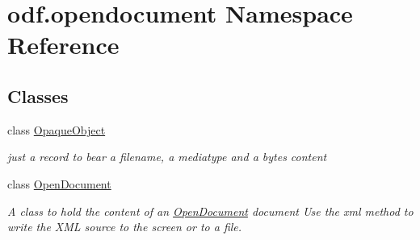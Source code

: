 \hypertarget{namespaceodf_1_1opendocument}{\section{odf.\+opendocument Namespace Reference}
\label{namespaceodf_1_1opendocument}
}
\subsection*{Classes}
\begin{DoxyCompactItemize}
\item 
class \hyperlink{classodf_1_1opendocument_1_1OpaqueObject}{Opaque\+Object}
\begin{DoxyCompactList}\small\item\em just a record to bear a filename, a mediatype and a bytes content \end{DoxyCompactList}\item 
class \hyperlink{classodf_1_1opendocument_1_1OpenDocument}{Open\+Document}
\begin{DoxyCompactList}\small\item\em A class to hold the content of an \hyperlink{classodf_1_1opendocument_1_1OpenDocument}{Open\+Document} document Use the xml method to write the X\+M\+L source to the screen or to a file. \end{DoxyCompactList}\end{DoxyCompactItemize}
